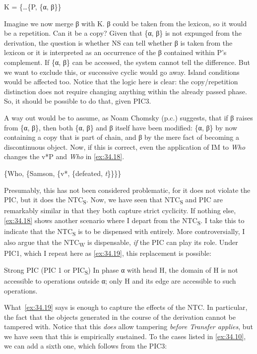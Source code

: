 \documentclass[output=paper]{langsci/langscibook}
\begin{document}
\ea%
    \label{ex:34.17}K = \{\dots{}\{P, \{α, β\}\}
\z

Imagine we now merge β with K. β could be taken from the lexicon, so it would
be a repetition. Can it be a copy? Given that \{α, β\} is not expunged from the
derivation, the question is whether \gls{NS} can tell whether β is taken from
the lexicon or it is interpreted as an occurrence of the β contained within P’s
complement.  If \{α, β\} can be accessed, the system cannot tell the difference.
But we want to exclude this, or successive cyclic  would go away.
Island conditions would be affected too. Notice that the logic here is clear:
the copy\slash repetition distinction does not require changing anything within the
already passed phase. So, it should be possible to do that, given
 PIC3.

A way out would be to assume, as Noam Chomsky (p.c.) suggests, that if β raises
from \{α, β\}, then both \{α, β\} and β itself have been modified: \{α, β\} by
now containing a copy that is part of chain, and β by the mere fact of becoming
a discontinuous object. Now, if this is correct, even the application of \gls{IM} to
\emph{Who} changes the v*P and \emph{Who} in \eqref{ex:34.18}.

\ea%
    \label{ex:34.18}
          \{Who, \{Samson, \{v*, \{defeated, \emph{t}\}\}\}\}
\z

Presumably, this has not been considered problematic, for it does not violate
the \gls{PIC}, but it does the \gls{NTC}\textsubscript{S}. Now, we have seen
that \gls{NTC}\textsubscript{S} and \gls{PIC} are remarkably similar in that
they both capture strict cyclicity. If nothing else, \eqref{ex:34.18} shows
another scenario where I depart from the \gls{NTC}\textsubscript{S}. I take
this to indicate that the \gls{NTC}\textsubscript{S} is to be dispensed with
entirely.  More controversially, I also argue that the NTC\textsubscript{W} is
dispensable, \emph{if} the \gls{PIC} can play its role. Under PIC1, which I
repeat here as \eqref{ex:34.19}, this replacement is possible:

\ea%
    \label{ex:34.19}Strong \gls{PIC} (\gls{PIC} 1 or PIC\textsubscript{S})
    In phase α with head H, the domain of H is not accessible to operations
    outside α; only H and its edge are accessible to such operations.
    \parencite[108]{Chomsky2000}
\z

What~\eqref{ex:34.19} says is enough to capture the effects of the
\gls{NTC}. In particular, the fact that the objects generated in the course of
the derivation cannot be tampered with. Notice that this \emph{does} allow
tampering \emph{before Transfer applies}, but we have seen that this is
empirically sustained. To the cases listed in \eqref{ex:34.10}, we can add
a sixth one, which follows from the PIC3:
\end{document}
